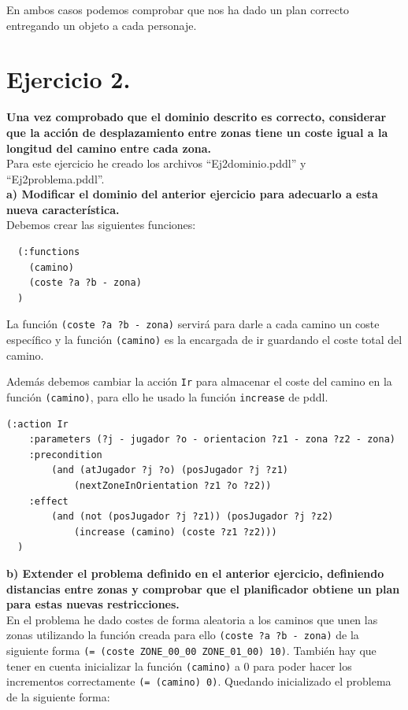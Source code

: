 \documentclass[12pt]{article}
\begin{document}
En ambos casos podemos comprobar que nos ha dado un plan correcto entregando un objeto a cada personaje.

\section{Ejercicio 2.} \textbf{Una vez comprobado que el dominio descrito es correcto, considerar que la acción de desplazamiento entre zonas tiene un coste igual a la longitud del camino entre cada zona.}\\

Para este ejercicio he creado los archivos ``Ej2dominio.pddl'' y ``Ej2problema.pddl''.\\

\textbf{a) Modificar el dominio del anterior ejercicio para adecuarlo a esta nueva
característica.}\\

Debemos crear las siguientes funciones:

\begin{verbatim}
  (:functions
    (camino)
    (coste ?a ?b - zona)
  )
\end{verbatim}

La función \texttt{(coste ?a ?b - zona)} servirá para darle a cada camino un coste específico y la función \texttt{(camino)} es la encargada de ir guardando el coste total del camino.

Además debemos cambiar la acción \texttt{Ir} para almacenar el coste del camino en la función \texttt{(camino)}, para ello he usado la función \texttt{increase} de pddl.

\begin{verbatim}
(:action Ir
    :parameters (?j - jugador ?o - orientacion ?z1 - zona ?z2 - zona)
    :precondition 
    	(and (atJugador ?j ?o) (posJugador ?j ?z1) 
    		(nextZoneInOrientation ?z1 ?o ?z2))
    :effect 
    	(and (not (posJugador ?j ?z1)) (posJugador ?j ?z2) 
    		(increase (camino) (coste ?z1 ?z2)))
  )

\end{verbatim}

\textbf{b) Extender el problema definido en el anterior ejercicio, definiendo distancias
entre zonas y comprobar que el planificador obtiene un plan para estas nuevas
restricciones.}\\

En el problema he dado costes de forma aleatoria a los caminos que unen las zonas utilizando la función creada para ello \texttt{(coste ?a ?b - zona)} de la siguiente forma \texttt{(= (coste ZONE\_00\_00 ZONE\_01\_00) 10)}. También hay que tener en cuenta inicializar la función \texttt{(camino)} a 0 para poder hacer los incrementos correctamente \texttt{(= (camino) 0)}. Quedando inicializado el problema de la siguiente forma:
\end{document}
